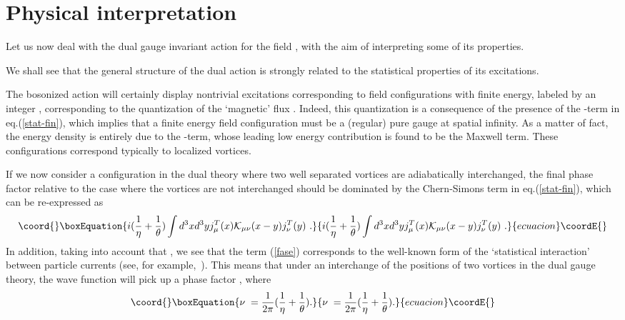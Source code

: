 \documentclass[a4paper,12pt]{article}
\begin{document}

\section{Physical interpretation}\label{inter}
Let us now deal with the dual gauge invariant action for the field
\coordHE{}, with the aim of interpreting some of its properties.

We shall see that the general structure of the dual action is strongly
related to the statistical properties of its excitations.

The bosonized action will certainly display nontrivial excitations
corresponding to field configurations with finite energy, labeled by
an integer \coordHE{}, corresponding to the quantization of the `magnetic'
flux {\cite{kov}}. Indeed, this quantization is a consequence of the presence of
the \coordHE{}-term in eq.(\ref{stat-fin}), which implies that a finite
energy field configuration \coordHE{} must be a (regular) pure gauge at
spatial infinity. As a matter of fact, the energy density is entirely
due to the \coordHE{}-term, whose leading low energy contribution is found to
be the Maxwell term. These configurations correspond typically to
localized vortices.



If we now consider a configuration in the dual theory where two well
separated vortices are adiabatically interchanged, the final phase
factor relative to the case where the vortices are not interchanged
should be dominated by the Chern-Simons term in eq.(\ref{stat-fin}),
which can be re-expressed as
\begin{equation}\coord{}\boxEquation{
i(\frac{1}{\eta}+\frac{1}{\theta})\int d^3x d^3y j_\mu^T(x) {\mathcal K}_{\mu\nu}(x-y) j_\nu^T(y)~.
\label{fase}
}{
i(\frac{1}{\eta}+\frac{1}{\theta})\int d^3x d^3y j_\mu^T(x) {\mathcal K}_{\mu\nu}(x-y) j_\nu^T(y)~.
}{ecuacion}\coordE{}\end{equation}
In addition, taking into account that \coordHE{}, we see
that the term (\ref{fase}) corresponds to the well-known form of the
`statistical interaction' between particle currents (see, for
example,~\cite{lerda}). This means that under an interchange of the
positions of two vortices in the dual gauge theory, the wave function
will pick up a phase factor \coordHE{}, where
\begin{equation}\coord{}\boxEquation{
  \label{eq:stat}
  \nu \;= \frac{1}{2\pi}(\frac{1}{\eta}+\frac{1}{\theta}).
}{
  \nu \;= \frac{1}{2\pi}(\frac{1}{\eta}+\frac{1}{\theta}).
}{ecuacion}\coordE{}\end{equation}
\end{document}
